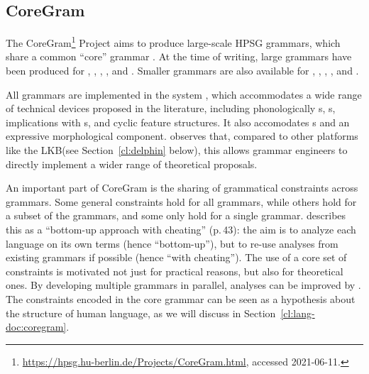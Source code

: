 \documentclass[output=paper,biblatex,babelshorthands,newtxmath,draftmode,colorlinks,citecolor=brown]{langscibook}
\begin{document}
\subsection{CoreGram}
\label{cl:coregram}

\enlargethispage{3pt}
%
%
The CoreGram\footnote{
	\url{https://hpsg.hu-berlin.de/Projects/CoreGram.html}, accessed 2021-06-11.
} Project aims to produce large-scale HPSG grammars,
which share a common ``core'' grammar \citep{MuellerCoreGram}.
At the time of writing, large grammars have been produced for  \citep{MuellerLehrbuch1},
 \citep{MOeDanish},  \citep{MG2010a}, 
\citep{MuellerMalteseSketch}, and  \citep{ML2013a}.  Smaller grammars are also
available for , , , , and .

All grammars are implemented in the  system \citep{MPR2002a-u,Penn2004a-u}, which
accommodates a wide range of technical devices proposed in the literature, including phonologically
s, s, implications with s, and
cyclic feature structures.  It also accomodates s and an expressive morphological
component. \citet{MelnikHandWritten} observes that, compared to other platforms like
the LKB\indexlkb (see Section~\ref{cl:delphin} below), this allows grammar engineers to directly
implement a wider range of theoretical proposals.

An important part of CoreGram is the sharing of grammatical constraints across grammars.  Some
general constraints hold for all grammars, while others hold for a subset of the grammars, and some
only hold for a single grammar.  \citet{MuellerCoreGram} describes this as a
``bottom-up approach with cheating'' (p.\,43): the
aim is to analyze each language on its own terms (hence ``bottom-up''), but to re-use analyses from
existing grammars if possible (hence ``with cheating'').
The use of a core set of constraints is motivated not just for practical reasons,
but also for theoretical ones.  By developing multiple grammars in parallel, analyses can be
improved by .  The constraints encoded in the core grammar can be
seen as a hypothesis about the structure of human language,
as we will discuss in Section~\ref{cl:lang-doc:coregram}.
\end{document}
